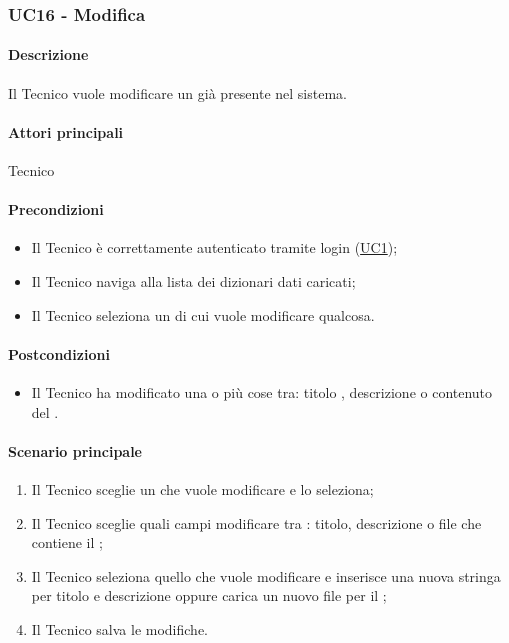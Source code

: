 \subsubsection{UC16 - Modifica }\label{UC16}
\paragraph*{Descrizione}
Il Tecnico vuole modificare un  già presente nel sistema.


\paragraph*{Attori principali}
Tecnico

\paragraph*{Precondizioni}
\begin{itemize}
  \item Il Tecnico è correttamente autenticato tramite login (\hyperref[UC1]{UC1});
  \item Il Tecnico naviga alla lista dei dizionari dati caricati;
  \item Il Tecnico seleziona un  di cui vuole modificare qualcosa.
\end{itemize}

\paragraph*{Postcondizioni}
\begin{itemize}
  \item Il Tecnico ha modificato una o più cose tra: titolo , descrizione o contenuto del .
\end{itemize}

\paragraph*{Scenario principale}
\begin{enumerate}
  \item Il Tecnico sceglie un  che vuole modificare e lo seleziona;
  \item Il Tecnico sceglie quali campi modificare tra : titolo, descrizione o file che contiene il ;
  \item Il Tecnico seleziona quello che vuole modificare e inserisce una nuova stringa per titolo e descrizione oppure carica un nuovo file per il ;
  \item Il Tecnico salva le modifiche.
\end{enumerate}

